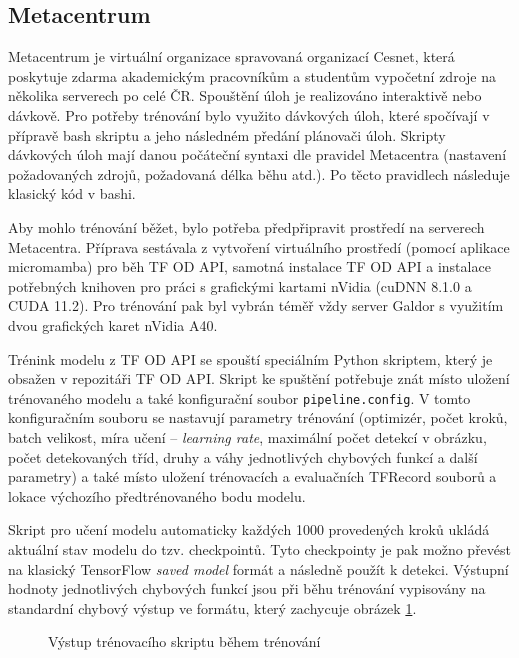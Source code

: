 \subsection*{Metacentrum}
Metacentrum je virtuální organizace spravovaná organizací Cesnet, která poskytuje zdarma akademickým pracovníkům a studentům vypočetní zdroje na několika serverech po celé ČR. Spouštění úloh je realizováno interaktivě nebo dávkově. Pro potřeby trénování bylo využito dávkových úloh, které spočívají v přípravě bash skriptu a jeho následném předání plánovači úloh. Skripty dávkových úloh mají danou počáteční syntaxi dle pravidel Metacentra (nastavení požadovaných zdrojů, požadovaná délka běhu atd.). Po těcto pravidlech následuje klasický kód v bashi.

Aby mohlo trénování běžet, bylo potřeba předpřipravit prostředí na serverech Metacentra. Příprava sestávala z vytvoření virtuálního prostředí (pomocí aplikace micromamba) pro běh TF OD API, samotná instalace TF OD API a instalace potřebných knihoven pro práci s grafickými kartami nVidia (cuDNN 8.1.0 a CUDA 11.2). Pro trénování pak byl vybrán téměř vždy server Galdor s využitím dvou grafických karet nVidia A40.

Trénink modelu z TF OD API se spouští speciálním Python skriptem, který je obsažen v repozitáři TF OD API. Skript ke spuštění potřebuje znát místo uložení trénovaného modelu a také konfigurační soubor \texttt{pipeline.config}. V tomto konfiguračním souboru se nastavují parametry trénování (optimizér, počet kroků, batch velikost, míra učení -- \emph{learning rate}, maximální počet detekcí v obrázku, počet detekovaných tříd, druhy a váhy jednotlivých chybových funkcí a další parametry) a také místo uložení trénovacích a evaluačních TFRecord souborů a lokace výchozího předtrénovaného bodu modelu.

Skript pro učení modelu automaticky každých 1000 provedených kroků ukládá aktuální stav modelu do tzv. checkpointů. Tyto checkpointy je pak možno převést na klasický TensorFlow \emph{saved model} formát a následně použít k detekci. Výstupní hodnoty jednotlivých chybových funkcí jsou při běhu trénování vypisovány na standardní chybový výstup ve formátu, který zachycuje obrázek \ref{obrazek:trenovani}.

\begin{figure}[H]
  \begin{center}
  \label{obrazek:trenovani}
  \caption{Výstup trénovacího skriptu během trénování}
  \end{center}
\end{figure}


